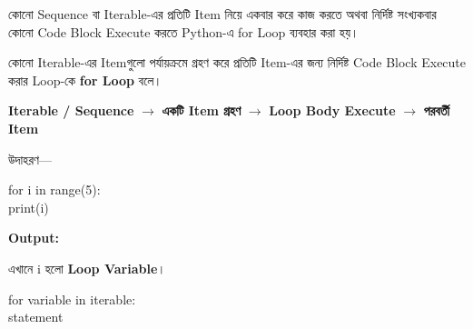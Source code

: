 
কোনো Sequence বা Iterable-এর প্রতিটি Item নিয়ে একবার করে কাজ করতে
অথবা নির্দিষ্ট সংখ্যকবার কোনো Code Block Execute করতে Python-এ
\textenglish{\ttfamily for} Loop ব্যবহার করা হয়।



\begin{definitionbox}

কোনো Iterable-এর Itemগুলো পর্যায়ক্রমে গ্রহণ করে প্রতিটি Item-এর জন্য
নির্দিষ্ট Code Block Execute করার Loop-কে
\textbf{\textenglish{\ttfamily for} Loop} বলে।

\end{definitionbox}

\begin{center}

\textbf{Iterable / Sequence}
\(\longrightarrow\)
\textbf{একটি Item গ্রহণ}
\(\longrightarrow\)
\textbf{Loop Body Execute}
\(\longrightarrow\)
\textbf{পরবর্তী Item}

\end{center}

উদাহরণ—

\begin{codebox}
\begin{english}
\ttfamily
for i in range(5):\\
\hspace*{4mm}print(i)
\end{english}
\end{codebox}

\textbf{Output:}

\begin{center}
\textenglish{    }
\end{center}

এখানে
\textenglish{\ttfamily i}
হলো \textbf{Loop Variable}।



\begin{codebox}
\begin{english}
\ttfamily
for variable in iterable:\\
\hspace*{4mm}statement
\end{english}
\end{codebox}

